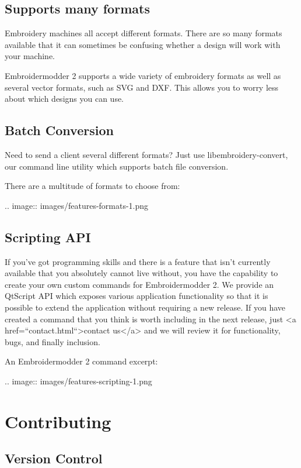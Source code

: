 \documentclass[10pt]{report}
\begin{document}
\subsection{Supports many formats}

Embroidery machines all accept different formats. There are so many formats available that it can sometimes be confusing whether a design will work with your machine.

Embroidermodder 2 supports a wide variety of embroidery formats as well as several vector formats, such as SVG and DXF. This allows you to worry less about which designs you can use.

\subsection{Batch Conversion}

Need to send a client several different formats? Just use libembroidery-convert, our command line utility which supports batch file conversion.

There are a multitude of formats to choose from:

.. image::
   images/features-formats-1.png

\subsection{Scripting API}

If you've got programming skills and there is a feature that isn't currently available that you absolutely cannot live without, you have the capability to create your own custom commands for Embroidermodder 2. We provide an QtScript API which exposes various application functionality so that it is possible to extend the application without requiring a new release. If you have created a command that you think is worth including in the next release, just <a href=``contact.html``>contact us</a> and we will review it for functionality, bugs, and finally inclusion.

An Embroidermodder 2 command excerpt:

.. image::
   images/features-scripting-1.png

\section{Contributing}

\subsection{Version Control}
\end{document}
